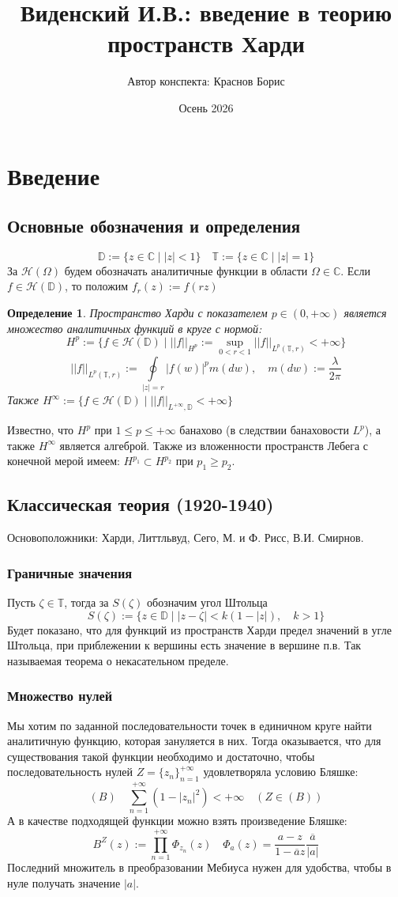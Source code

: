 \documentclass[12pt,a4paper]{article} %
\author{Автор конспекта: Краснов Борис} %
\title{Виденский И.В.: введение в теорию пространств Харди} %
\date{Осень 2026} %
\newtheorem{definition}{Определение}
\newcommand{\Co}{\mathbb{C}}
\newcommand{\D}{\mathbb{D}}
\newcommand{\T}{\mathbb{T}}
\renewcommand{\H}{\mathcal{H}}
\begin{document}
	\maketitle
	\tableofcontents
	\clearpage
	
	\section{Введение}
	\subsection{Основные обозначения и определения}
	$$\D:=\{z\in\Co\mid|z|<1\}\quad\T:=\{z\in\Co\mid|z|=1\}$$
	За $\H(\Omega)$ будем обозначать аналитичные функции в области $\Omega\in\Co$. Если $f\in\H(\D)$, то положим $f_r(z):=f(rz)$
	\begin{definition}
		Пространство Харди с показателем $p\in(0,+\infty)$ является множество аналитичных функций в круге с нормой:
		$$H^p:=\{f\in\H(\D)\mid||f||_{H^p}:=\sup\limits_{0<r<1}||f||_{L^p(\T,r)}<+\infty\}$$
		$$||f||_{L^p(\T,r)}:=\oint\limits_{|z|=r}|f(w)|^pm(dw),\quad m(dw):=\frac{\lambda}{2\pi}$$
		Также $H^{\infty}:=\{f\in\H(\D)\mid||f||_{L^{+\infty},\D}<+\infty\}$
	\end{definition}
	Известно, что $H^p$ при $1\leq p\leq+\infty$ банахово (в следствии банаховости $L^p$), а также $H^{\infty}$ является алгеброй. Также из вложенности пространств Лебега с конечной мерой имеем: $H^{p_1}\subset H^{p_2}$ при $p_1\geq p_2$.
	\subsection{Классическая теория (1920-1940)}
	Основоположники: Харди, Литтльвуд, Сего, М. и Ф. Рисс, В.И. Смирнов.
	\subsubsection{Граничные значения}
	Пусть $\zeta\in\T$, тогда за $S(\zeta)$ обозначим угол Штольца
	$$S(\zeta):=\{z\in\D\mid|z-\zeta|<k(1-|z|),\quad k>1\}$$
	Будет показано, что для функций из пространств Харди предел значений в угле Штольца, при приблежении к вершины есть значение в вершине п.в. Так называемая теорема о некасательном пределе.
	\subsubsection{Множество нулей}
	Мы хотим по заданной последовательности точек в единичном круге найти аналитичную функцию, которая зануляется в них. Тогда оказывается, что для существования такой функции необходимо и достаточно, чтобы последовательность нулей $Z=\{z_n\}_{n=1}^{+\infty}$ удовлетворяла условию Бляшке:
	$$(B)\quad \sum_{n=1}^{+\infty}(1-|z_n|^2)<+\infty\quad (Z\in(B))$$
	А в качестве подходящей функции можно взять произведение Бляшке:
	$$B^Z(z):=\prod_{n=1}^{+\infty}\Phi_{z_n}(z)\quad\Phi_{a}(z)=\frac{a-z}{1-\overline{a}z}\frac{\overline{a}}{|a|}$$
	Последний множитель в преобразовании Мебиуса нужен для удобства, чтобы в нуле получать значение $|a|$.
\end{document}
